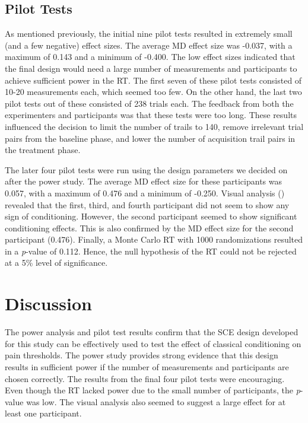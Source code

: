 \documentclass{jote-article}
\begin{document}
\subsection{Pilot Tests}

As mentioned previously, the initial nine pilot tests resulted in extremely small (and a few negative) effect sizes. The average MD effect size was -0.037, with a maximum of 0.143 and a minimum of -0.400. The low effect sizes indicated that the final design would need a large number of measurements and participants to achieve sufficient power in the RT. The first seven of these pilot tests consisted of 10-20 measurements each, which seemed too few. On the other hand, the last two pilot tests out of these consisted of 238 trials each. The feedback from both the experimenters and participants was that these tests were too long. These results influenced the decision to limit the number of trails to 140, remove irrelevant trial pairs from the baseline phase, and lower the number of acquisition trail pairs in the treatment phase.

The later four pilot tests were run using the design parameters we decided on after the power study. The average MD effect size for these participants was 0.057, with a maximum of 0.476 and a minimum of -0.250. Visual analysis () revealed that the first, third, and fourth participant did not seem to show any sign of conditioning. However, the second participant seemed to show significant conditioning effects. This is also confirmed by the MD effect size for the second participant (0.476). Finally, a Monte Carlo RT with 1000 randomizations resulted in a \emph{p}-value of 0.112. Hence, the null hypothesis of the RT could not be rejected at a 5\% level of significance.

\section{Discussion}

The power analysis and pilot test results confirm that the SCE design developed for this study can be effectively used to test the effect of classical conditioning on pain thresholds. The power study provides strong evidence that this design results in sufficient power if the number of measurements and participants are chosen correctly. The results from the final four pilot tests were encouraging. Even though the RT lacked power due to the small number of participants, the \emph{p}-value was low. The visual analysis also seemed to suggest a large effect for at least one participant.
\end{document}
